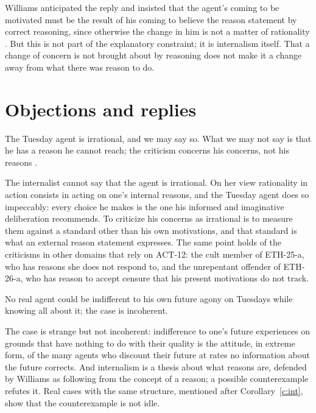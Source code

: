 \documentclass{situationist-preprint}
\begin{document}
Williams anticipated the reply and insisted that the agent's coming to be motivated must be the result of his coming to believe the reason statement by correct reasoning, since otherwise the change in him is not a matter of rationality \citep{Williams1981}. But this is not part of the explanatory constraint; it is internalism itself. That a change of concern is not brought about by reasoning does not make it a change away from what there was reason to do.

\section{Objections and replies}

\begin{objection}
The Tuesday agent is irrational, and we may say so. What we may not say is that he has a reason he cannot reach; the criticism concerns his concerns, not his reasons \citep{Williams1995}.
\end{objection}

\begin{reply}
The internalist cannot say that the agent is irrational. On her view rationality in action consists in acting on one's internal reasons, and the Tuesday agent does so impeccably: every choice he makes is the one his informed and imaginative deliberation recommends. To criticize his concerns as irrational is to measure them against a standard other than his own motivations, and that standard is what an external reason statement expresses. The same point holds of the criticisms in other domains that rely on ACT-12: the cult member of ETH-25-a, who has reasons she does not respond to, and the unrepentant offender of ETH-26-a, who has reason to accept censure that his present motivations do not track.
\end{reply}

\begin{objection}
No real agent could be indifferent to his own future agony on Tuesdays while knowing all about it; the case is incoherent.
\end{objection}

\begin{reply}
The case is strange but not incoherent: indifference to one's future experiences on grounds that have nothing to do with their quality is the attitude, in extreme form, of the many agents who discount their future at rates no information about the future corrects. And internalism is a thesis about what reasons are, defended by Williams as following from the concept of a reason; a possible counterexample refutes it. Real cases with the same structure, mentioned after Corollary~\ref{c:int}, show that the counterexample is not idle.
\end{reply}
\end{document}
